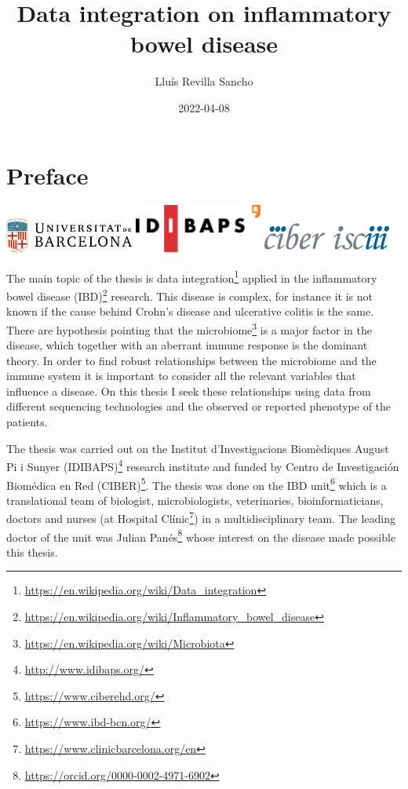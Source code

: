 \documentclass[
  12pt,
  a4paper,
  twoside,
  openright]{book}
\title{Data integration on inflammatory bowel disease}
\author{Lluís Revilla Sancho}
\date{2022-04-08}
\DeclareRobustCommand{\href}[2]{#2\footnote{\url{#1}}}
\begin{document}
\maketitle

{
\hypersetup{linkcolor=}
\setcounter{tocdepth}{2}
\tableofcontents
}
\listoffigures
\listoftables
\hypertarget{preface}{%
\chapter*{Preface}\label{preface}}

\includegraphics[width=1.66667in,height=\textheight]{images/ub_logo.png} \includegraphics[width=1.66667in,height=\textheight]{images/idibaps_logo.png} \includegraphics[width=1.66667in,height=0.39583in]{images/logo_ciber.png}

The main topic of the thesis is \href{https://en.wikipedia.org/wiki/Data_integration}{data integration} applied in the \href{https://en.wikipedia.org/wiki/Inflammatory_bowel_disease}{inflammatory bowel disease (IBD)} research.
This disease is complex, for instance it is not known if the cause behind Crohn's disease and ulcerative colitis is the same.
There are hypothesis pointing that the \href{https://en.wikipedia.org/wiki/Microbiota}{microbiome} is a major factor in the disease, which together with an aberrant immune response is the dominant theory.
In order to find robust relationships between the microbiome and the immune system it is important to consider all the relevant variables that influence a disease.
On this thesis I seek these relationships using data from different sequencing technologies and the observed or reported phenotype of the patients.

The thesis was carried out on the \href{http://www.idibaps.org/}{Institut d'Investigacions Biomèdiques August Pi i Sunyer (IDIBAPS)} research institute and funded by \href{https://www.ciberehd.org/}{Centro de Investigación Biomédica en Red (CIBER)}.
The thesis was done on \href{https://www.ibd-bcn.org/}{the IBD unit} which is a translational team of biologist, microbiologists, veterinaries, bioinformaticians, doctors and nurses (at \href{https://www.clinicbarcelona.org/en}{Hospital Clínic}) in a multidisciplinary team.
The leading doctor of the unit was \href{https://orcid.org/0000-0002-4971-6902}{Julian Panés} whose interest on the disease made possible this thesis.
\end{document}
